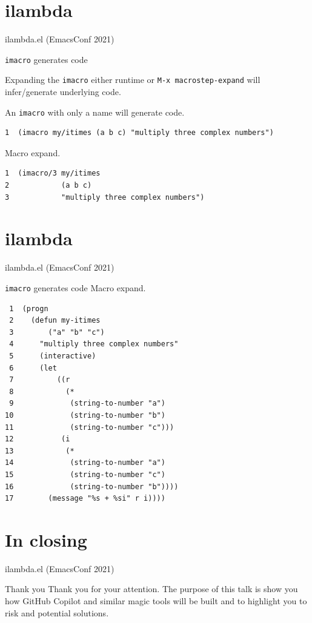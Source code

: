 \documentclass[presentation]{beamer}
\begin{document}
\section{ilambda}
\label{sec:org53fc1e8}
\begin{frame}[label={sec:org87f7609},fragile]{ilambda.el (EmacsConf 2021)}
 \begin{block}{\texttt{imacro} generates code}
{\tiny
Expanding the \texttt{imacro} either runtime or 
\texttt{M-x macrostep-expand}
will infer/generate underlying code.

An \texttt{imacro} with only a name will generate code.
}

{\tiny
\begin{verbatim}
1  (imacro my/itimes (a b c) "multiply three complex numbers")
\end{verbatim}
}

{\tiny
Macro expand.
}

{\tiny
\begin{verbatim}
1  (imacro/3 my/itimes
2            (a b c)
3            "multiply three complex numbers")
\end{verbatim}
}
\end{block}
\end{frame}

\section{ilambda}
\label{sec:org98f1e5c}
\begin{frame}[label={sec:orgb71a6ac},fragile]{ilambda.el (EmacsConf 2021)}
 \begin{block}{\texttt{imacro} generates code}
{\tiny
Macro expand.
}

{\tiny
\begin{verbatim}
 1  (progn
 2    (defun my-itimes
 3        ("a" "b" "c")
 4      "multiply three complex numbers"
 5      (interactive)
 6      (let
 7          ((r
 8            (*
 9             (string-to-number "a")
10             (string-to-number "b")
11             (string-to-number "c")))
12           (i
13            (*
14             (string-to-number "a")
15             (string-to-number "c")
16             (string-to-number "b"))))
17        (message "%s + %si" r i))))
\end{verbatim}
}
\end{block}
\end{frame}

\section{In closing}
\label{sec:orgf3a2cfb}
\begin{frame}[label={sec:org912c55c}]{ilambda.el (EmacsConf 2021)}
\begin{block}{Thank you}
Thank you for your attention. The purpose of
this talk is show you how GitHub Copilot and
similar magic tools will be built and to
highlight you to risk and potential solutions.
\end{block}
\end{frame}
\end{document}
